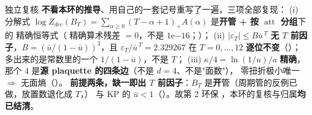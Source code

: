 \LT{} 独立复核  \textbf{不看本环的推导}、用自己的一套记号重写了一遍，三项全部复现：
(i) 分解式 $\log Z_{dec}(B_T)=\sum_{\alpha\ge0}(T-\alpha+1)_+A(\alpha)$ 是\textbf{开管 + 按 $\operatorname{att}$ 分组}下的
精确恒等式（ 精确算术残差 $=0$，不是 $1\mathrm{e}{-16}$；）；
(ii) $|\varepsilon_T|\le B\bar u^{\,T}$ \textbf{无 $T$ 前因子}，$B=(\bar u/(1-\bar u))^3$，且 $\varepsilon_T/\bar u^{\,T}=2.329267$
在 $T=0,\dots,12$ \textbf{逐位不变}（）；多出来的是常数里的一个 $1/(1-\bar u)$，不是 $T$；
(iii) $\kappa/4=\ln(1/u)/a$ \textbf{精确}，那个 $4$ 是\textbf{源 plaquette 的四条边}（不是 $d=4$、不是"面数"），
零扭折极小唯一 $\Rightarrow$ 无面熵（）。
\textbf{前提两条，缺一即出 $T$ 前因子}：$B_T$ 是\textbf{开}管（周期管的反例已做，放置数退化成 $T$，）
与 KP 的 $\bar u<1$（）。故第 2 环保 \LT，本环的复核与归属\textbf{均已结清}。
